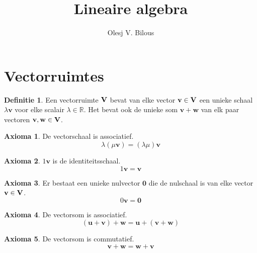 \documentclass{amsart}
\theoremstyle{definition}
\newtheorem{axm}{Axioma}[section]
\newtheorem{dfn}{Definitie}[section]
\newcommand{\realnums}{\mathbb{R}}
\newcommand{\vecspace}[1][v]{\mathrm{\mathbf{\MakeUppercase#1}}}
\newcommand{\vvec}[1][v]{\mathbf{#1}}
\newcommand{\zerovec}{\vvec[0]}
\begin{document}
\title{Lineaire algebra}
\author{Olesj V. Bilous}
\maketitle

\section{Vectorruimtes}


\begin{dfn}
	Een vectorruimte $\vecspace$ bevat van elke vector $\vvec \in \vecspace$ een unieke schaal $\lambda \vvec$ voor elke scalair $\lambda \in \realnums$. Het bevat ook de unieke som $\vvec + \vvec[w]$ van elk paar vectoren $\vvec, \vvec[w] \in \vecspace$.
\end{dfn}

\begin{axm}
	De vectorschaal is associatief.
	\begin{equation*}
		\lambda (\mu \vvec) = (\lambda\mu)\vvec
	\end{equation*}
\end{axm}

\begin{axm}
	$1\vvec$ is de identiteitsschaal.
	\begin{equation*}
		1\vvec=\vvec
	\end{equation*}
\end{axm}

\begin{axm}
	Er bestaat een unieke nulvector $\zerovec$ die de nulschaal is van elke vector $\vvec \in \vecspace$.
	\begin{equation*}
		0\vvec=\zerovec
	\end{equation*}
\end{axm}

\begin{axm}
	De vectorsom is associatief.
	\begin{equation*}
		(\vvec[u] + \vvec) + \vvec[w] = \vvec[u] + (\vvec + \vvec[w])
	\end{equation*}
\end{axm}

\begin{axm}
	De vectorsom is commutatief.
	\begin{equation*}
		\vvec + \vvec[w] = \vvec[w] + \vvec
	\end{equation*}
\end{axm}
\end{document}
